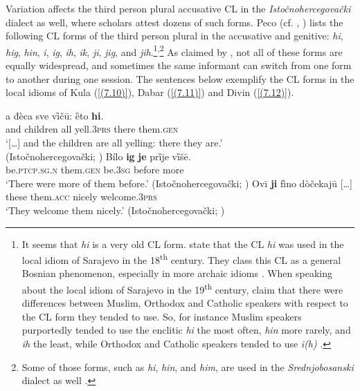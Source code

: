 Variation affects the third person plural accusative CL in the \textit{Istočnohercegovački} dialect as well, where scholars attest dozens of such forms. Peco (cf. \citealt[202]{Peco07a}, \citealt[311]{Peco07b}) lists the following CL forms of the third person plural in the accusative and genitive: \textit{hi}, \textit{hig}, \textit{hin}, \textit{i}, \textit{ig}, \textit{ih}, \textit{ik}, \textit{ji}, \textit{jig}, and \textit{jih}.\footnote{It seems that \textit{hi} is a very old CL form. \citet[14]{HTS09} state that the CL \textit{hi} was used in the local idiom of Sarajevo in the 18\textsuperscript{th} century. They class this CL as a general Bosnian phenomenon, especially in more archaic idioms \citep[cf.][14]{HTS09}. When speaking about the local idiom of Sarajevo in the 19\textsuperscript{th} century, \citet[21]{HTS09} claim that there were differences between Muslim, Orthodox and Catholic speakers with respect to the CL form they tended to use. So, for instance Muslim speakers purportedly tended to use the enclitic \textit{hi} the most often, \textit{hin} more rarely, and \textit{ih} the least, while Orthodox and Catholic speakers tended to use \textit{i(h)} \citep[21]{HTS09}.}\textsuperscript{,}\footnote{Some of those forms, such as \textit{hi}, \textit{hin}, and \textit{him}, are used in the \textit{Srednjobosanski} dialect as well \citep[41]{Halilovic05}.} As claimed by \citet[202f]{Peco07a}, not all of these forms are equally widespread, and sometimes the same informant can switch from one form to another during one session. The sentences below exemplify the CL forms in the local idioms of Kula (\ref{(7.10)}), Dabar (\ref{(7.11)}) and Divin (\ref{(7.12)}). 

\begin{exe}\ex\label{(7.10)}
\gll [\dots] a  đèca  sve  vȋčū: ȅto  \textbf{hi}. \\
{} and children all yell.3\textsc{prs}  there them.\textsc{gen} \\
\glt ‘[\dots] and the children are all yelling: there they are.’ \\
\hfill  (Istočnohercegovački; \citealt[281]{Peco07a} )
\ex\label{(7.11)}
\gll Bílo  \textbf{ig}  \textbf{je}  prȉje   vȉšē.  \\
be.\textsc{ptcp.sg.n} them.\textsc{gen} be.\textsc{3sg}  before more \\
\glt ‘There were more of them before.’
\hfill  (Istočnohercegovački; \citealt[285]{Peco07a})
\ex\label{(7.12)}
\gll Ovī  \textbf{ji}  fìno  {dòčekajū [\dots]} \\
these them.\textsc{acc} nicely welcome.3\textsc{prs} \\
\glt ‘They welcome them nicely.’
\hfill  (Istočnohercegovački; \citealt[287]{Peco07a})
\end{exe}

